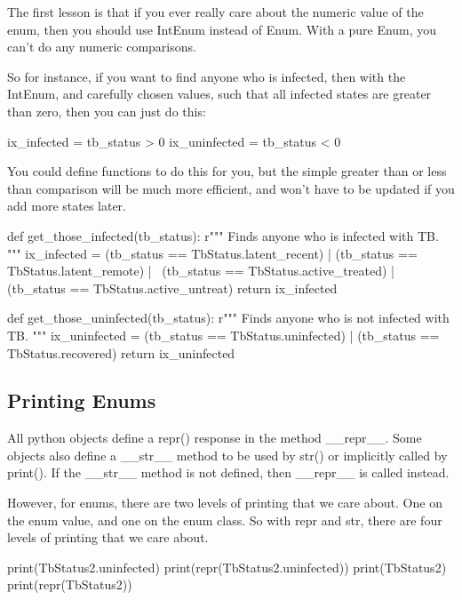 \documentclass[12pt]{article}
\begin{document}
The first lesson is that if you ever really care about the numeric value of the enum, then you should use IntEnum instead of Enum.  With a pure Enum, you can't do any numeric comparisons.

So for instance, if you want to find anyone who is infected, then with the IntEnum, and carefully chosen values, such that all infected states are greater than zero, then you can just do this:

\begin{Python}
    ix_infected = tb_status > 0
    ix_uninfected = tb_status < 0
\end{Python}

You could define functions to do this for you, but the simple greater than or less than comparison will be much more efficient, and won't have to be updated if you add more states later.

\begin{Python}
def get_those_infected(tb_status):
    r"""
    Finds anyone who is infected with TB.
    """
    ix_infected = (tb_status == TbStatus.latent_recent) | (tb_status == TbStatus.latent_remote) | \
        (tb_status == TbStatus.active_treated) | (tb_status == TbStatus.active_untreat)
    return ix_infected

def get_those_uninfected(tb_status):
    r"""
    Finds anyone who is not infected with TB.
    """
    ix_uninfected = (tb_status == TbStatus.uninfected) | (tb_status == TbStatus.recovered)
    return ix_uninfected
\end{Python}

\subsection{Printing Enums}\label{h2:Printing_enums}
All python objects define a repr() response in the method \_\_repr\_\_.  Some objects also define a \_\_str\_\_ method to be used by str() or implicitly called by print().  If the \_\_str\_\_ method is not defined, then \_\_repr\_\_ is called instead.

However, for enums, there are two levels of printing that we care about.  One on the enum value, and one on the enum class.  So with repr and str, there are four levels of printing that we care about.

\begin{Python}
    print(TbStatus2.uninfected)
    print(repr(TbStatus2.uninfected))
    print(TbStatus2)
    print(repr(TbStatus2))
\end{Python}
\end{document}
